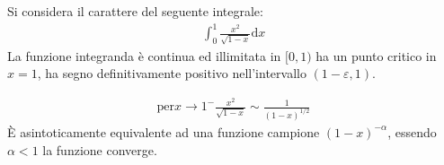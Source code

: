 \documentclass{article}
\numberwithin{equation}{subsection}
\begin{document}

Si considera il carattere del seguente integrale:
\begin{gather*}
    \displaystyle\int_0^1\frac{x^2}{\sqrt{1-x}}\mathrm{d}x
\end{gather*}
La funzione integranda è continua ed illimitata in $[0,1)$ ha un punto critico in $x=1$, ha segno definitivamente positivo nell'intervallo $(1-\varepsilon, 1)$. 

\begin{gather*}
    \mbox{per}x\to1^-\displaystyle\frac{x^2}{\sqrt{1-x}}\sim\frac{1}{(1-x)^{1/2}}
\end{gather*}
È asintoticamente equivalente ad una funzione campione $(1-x)^{-\alpha}$, essendo $\alpha<1$ la funzione converge. 
\end{document}
